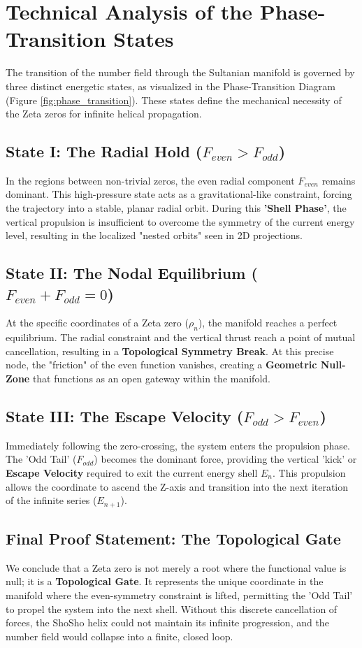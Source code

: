 \documentclass[11pt,a4paper]{article}
\begin{document}
\section{Technical Analysis of the Phase-Transition States}

The transition of the number field through the Sultanian manifold is governed by three distinct energetic states, as visualized in the Phase-Transition Diagram (Figure \ref{fig:phase_transition}). These states define the mechanical necessity of the Zeta zeros for infinite helical propagation.

\subsection{State I: The Radial Hold ($F_{even} > F_{odd}$)}
In the regions between non-trivial zeros, the even radial component $F_{even}$ remains dominant. This high-pressure state acts as a gravitational-like constraint, forcing the trajectory into a stable, planar radial orbit. During this \textbf{'Shell Phase'}, the vertical propulsion is insufficient to overcome the symmetry of the current energy level, resulting in the localized "nested orbits" seen in 2D projections.

\subsection{State II: The Nodal Equilibrium ($F_{even} + F_{odd} = 0$)}
At the specific coordinates of a Zeta zero ($\rho_n$), the manifold reaches a perfect equilibrium. The radial constraint and the vertical thrust reach a point of mutual cancellation, resulting in a \textbf{Topological Symmetry Break}. At this precise node, the "friction" of the even function vanishes, creating a \textbf{Geometric Null-Zone} that functions as an open gateway within the manifold.

\subsection{State III: The Escape Velocity ($F_{odd} > F_{even}$)}
Immediately following the zero-crossing, the system enters the propulsion phase. The 'Odd Tail' ($F_{odd}$) becomes the dominant force, providing the vertical 'kick' or \textbf{Escape Velocity} required to exit the current energy shell $E_n$. This propulsion allows the coordinate to ascend the Z-axis and transition into the next iteration of the infinite series ($E_{n+1}$).

\subsection{Final Proof Statement: The Topological Gate}
We conclude that a Zeta zero is not merely a root where the functional value is null; it is a \textbf{Topological Gate}. It represents the unique coordinate in the manifold where the even-symmetry constraint is lifted, permitting the 'Odd Tail' to propel the system into the next shell. Without this discrete cancellation of forces, the ShoSho helix could not maintain its infinite progression, and the number field would collapse into a finite, closed loop.
\end{document}

